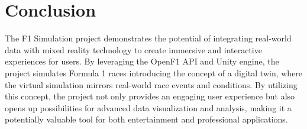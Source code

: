 \documentclass[
	a4paper, %
	10pt, %
	unnumberedsections, %
	twoside, %
]{LTJournalArticle}
\begin{document}
\section{Conclusion}
The F1 Simulation project demonstrates the potential of integrating real-world data with mixed reality technology to create immersive and interactive experiences for users. By leveraging the OpenF1 API and Unity engine, the project simulates Formula 1 races introducing the concept of a digital twin, where the virtual simulation mirrors real-world race events and conditions. By utilizing this concept, the project not only provides an engaging user experience but also opens up possibilities for advanced data visualization and analysis, making it a potentially valuable tool for both entertainment and professional applications.
\printbibliography
\end{document}
